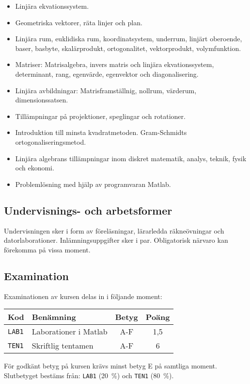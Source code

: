 \begin{itemize}
\tightlist
\item
  Linjära ekvationssystem.
\item
  Geometriska vektorer, räta linjer och plan.\\
\item
  Linjära rum, euklidiska rum, koordinatsystem, underrum, linjärt
  oberoende, baser, basbyte, skalärprodukt, ortogonalitet,
  vektorprodukt, volymfunktion.
\item
  Matriser: Matrisalgebra, invers matris och linjära ekvationssystem,
  determinant, rang, egenvärde, egenvektor och diagonalisering.
\item
  Linjära avbildningar: Matrisframställnig, nollrum, värderum,
  dimensionssatsen.
\item
  Tillämpningar på projektioner, speglingar och rotationer.
\item
  Introduktion till minsta kvadratmetoden. Gram-Schmidts
  ortogonaliseringsmetod.
\item
  Linjära algebrans tillämpningar inom diskret matematik, analys,
  teknik, fysik och ekonomi.
\item
  Problemlösning med hjälp av programvaran Matlab.
\end{itemize}

\subsection*{Undervisnings- och arbetsformer}

Undervisningen sker i form av föreläsningar, lärarledda räkneövningar
och datorlaborationer. Inlämningsuppgifter sker i par. Obligatorisk
närvaro kan förekomma på vissa moment.

\subsection*{Examination}

Examinationen av kursen delas in i följande moment:

\begin{longtable}[]{@{}llcc@{}}
\toprule
\textsf{Kod} & \textsf{Benämning} & \textsf{Betyg} & \textsf{Poäng}\tabularnewline
\midrule
\endhead
\texttt{LAB1} & Laborationer i Matlab & A-F & 1,5\tabularnewline
\texttt{TEN1} & Skriftlig tentamen & A-F & 6\tabularnewline
\bottomrule
\end{longtable}

För godkänt betyg på kursen krävs minst betyg E på samtliga moment.
Slutbetyget bestäms från: \texttt{LAB1} (20~\%) och \texttt{TEN1} (80~\%).

